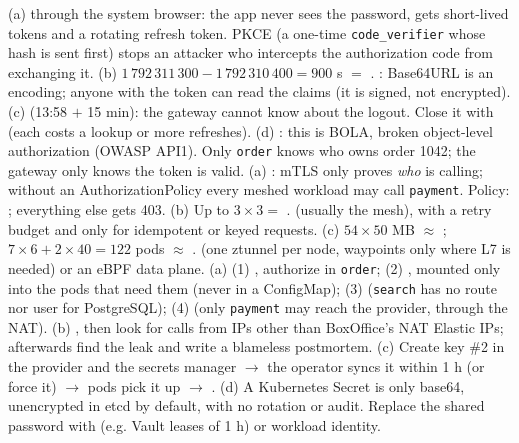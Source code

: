  (a)  through the system browser: the app never sees the password, gets short-lived tokens and a rotating refresh token. PKCE (a one-time \texttt{code\_verifier} whose hash is sent first) stops an attacker who intercepts the authorization code from exchanging it. (b) $1\,792\,311\,300 - 1\,792\,310\,400 = 900$ s $=$ . : Base64URL is an encoding; anyone with the token can read the claims (it is signed, not encrypted). (c)  (13:58 $+$ 15 min): the gateway cannot know about the logout. Close it with  (each costs a lookup or more refreshes). (d) : this is BOLA, broken object-level authorization (OWASP API1). Only \texttt{order} knows who owns order 1042; the gateway only knows the token is valid.
 (a) : mTLS only proves \emph{who} is calling; without an AuthorizationPolicy every meshed workload may call \texttt{payment}. Policy: ; everything else gets 403. (b) Up to $3 \times 3 =$ .  (usually the mesh), with a retry budget and only for idempotent or keyed requests. (c) $54 \times 50$ MB $\approx$ ; $7 \times 6 + 2 \times 40 = 122$ pods $\approx$ .  (one ztunnel per node, waypoints only where L7 is needed) or an eBPF data plane.
 (a) (1) , authorize in \texttt{order}; (2) , mounted only into the pods that need them (never in a ConfigMap); (3)  (\texttt{search} has no route nor user for PostgreSQL); (4)  (only \texttt{payment} may reach the provider, through the NAT). (b) , then look for calls from IPs other than BoxOffice's NAT Elastic IPs; afterwards find the leak and write a blameless postmortem. (c) Create key \#2 in the provider and the secrets manager $\to$ the operator syncs it within 1 h (or force it) $\to$ pods pick it up $\to$ . (d) A Kubernetes Secret is only base64, unencrypted in etcd by default, with no rotation or audit. Replace the shared password with  (e.g. Vault leases of 1 h) or workload identity.
